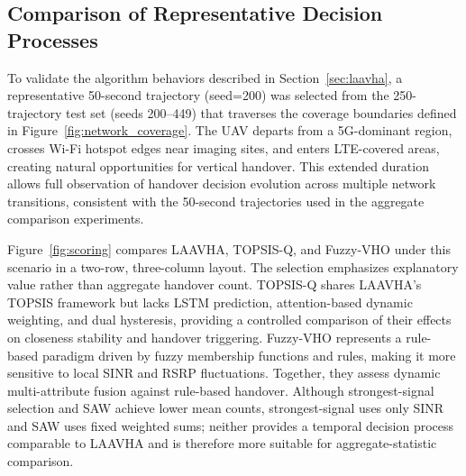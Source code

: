 \documentclass[final,3p,times,twocolumn]{elsarticle}
\begin{document}
\subsection{Comparison of Representative Decision Processes}\label{sec:process}

To validate the algorithm behaviors described in Section~\ref{sec:laavha}, a representative 50-second trajectory (seed=200) was selected from the 250-trajectory test set (seeds 200--449) that traverses the coverage boundaries defined in Figure~\ref{fig:network_coverage}. The UAV departs from a 5G-dominant region, crosses Wi-Fi hotspot edges near imaging sites, and enters LTE-covered areas, creating natural opportunities for vertical handover. This extended duration allows full observation of handover decision evolution across multiple network transitions, consistent with the 50-second trajectories used in the aggregate comparison experiments.

Figure~\ref{fig:scoring} compares LAAVHA, TOPSIS-Q, and Fuzzy-VHO under this scenario in a two-row, three-column layout. The selection emphasizes explanatory value rather than aggregate handover count. TOPSIS-Q shares LAAVHA's TOPSIS framework but lacks LSTM prediction, attention-based dynamic weighting, and dual hysteresis, providing a controlled comparison of their effects on closeness stability and handover triggering. Fuzzy-VHO represents a rule-based paradigm driven by fuzzy membership functions and rules, making it more sensitive to local SINR and RSRP fluctuations. Together, they assess dynamic multi-attribute fusion against rule-based handover. Although strongest-signal selection and SAW achieve lower mean counts, strongest-signal uses only SINR and SAW uses fixed weighted sums; neither provides a temporal decision process comparable to LAAVHA and is therefore more suitable for aggregate-statistic comparison.
\end{document}
